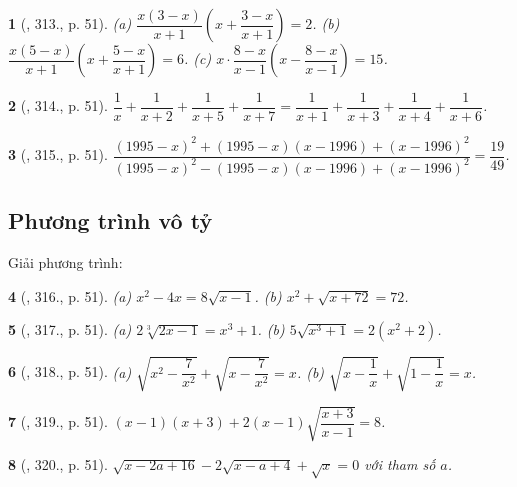 \documentclass{article}
\newtheorem{baitoan}{}
\begin{document}
\begin{baitoan}[\cite{Binh_Toan_9_tap_2}, 313., p. 51]
	(a) $\dfrac{x(3 - x)}{x + 1}\left(x + \dfrac{3 - x}{x + 1}\right) = 2$. (b) $\dfrac{x(5 - x)}{x + 1}\left(x + \dfrac{5 - x}{x + 1}\right) = 6$. (c) $x\cdot\dfrac{8 - x}{x - 1}\left(x - \dfrac{8 - x}{x - 1}\right) = 15$.
\end{baitoan}

\begin{baitoan}[\cite{Binh_Toan_9_tap_2}, 314., p. 51]
	$\dfrac{1}{x} + \dfrac{1}{x + 2} + \dfrac{1}{x + 5} + \dfrac{1}{x + 7} = \dfrac{1}{x + 1} + \dfrac{1}{x + 3} + \dfrac{1}{x + 4} + \dfrac{1}{x + 6}$.
\end{baitoan}

\begin{baitoan}[\cite{Binh_Toan_9_tap_2}, 315., p. 51]
	$\dfrac{(1995 - x)^2 + (1995 - x)(x - 1996) + (x - 1996)^2}{(1995 - x)^2 - (1995 - x)(x - 1996) + (x - 1996)^2} = \dfrac{19}{49}$.
\end{baitoan}

\subsection{Phương trình vô tỷ}
Giải phương trình:

\begin{baitoan}[\cite{Binh_Toan_9_tap_2}, 316., p. 51]
	(a) $x^2 - 4x = 8\sqrt{x - 1}$. (b) $x^2 + \sqrt{x + 72} = 72$.
\end{baitoan}

\begin{baitoan}[\cite{Binh_Toan_9_tap_2}, 317., p. 51]
	(a) $2\sqrt[3]{2x - 1} = x^3 + 1$. (b) $5\sqrt{x^3 + 1} = 2(x^2 + 2)$.
\end{baitoan}

\begin{baitoan}[\cite{Binh_Toan_9_tap_2}, 318., p. 51]
	(a) $\sqrt{x^2 - \dfrac{7}{x^2}} + \sqrt{x - \dfrac{7}{x^2}} = x$. (b) $\sqrt{x - \dfrac{1}{x}} + \sqrt{1 - \dfrac{1}{x}} = x$.
\end{baitoan}

\begin{baitoan}[\cite{Binh_Toan_9_tap_2}, 319., p. 51]
	$(x - 1)(x + 3) + 2(x - 1)\sqrt{\dfrac{x + 3}{x - 1}} = 8$.
\end{baitoan}

\begin{baitoan}[\cite{Binh_Toan_9_tap_2}, 320., p. 51]
	$\sqrt{x - 2a + 16} - 2\sqrt{x - a + 4} + \sqrt{x} = 0$ với tham số $a$.
\end{baitoan}
\end{document}
